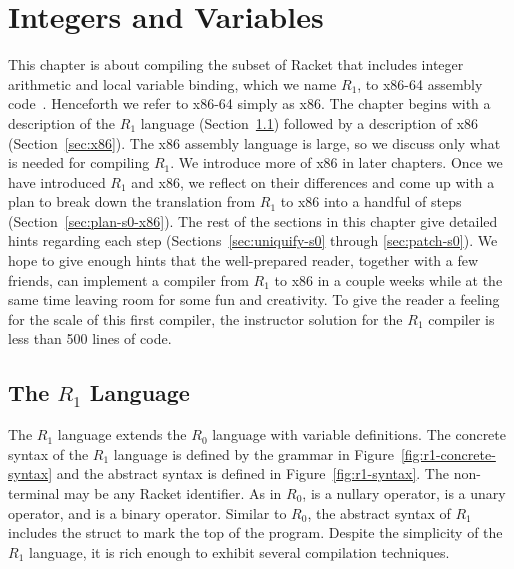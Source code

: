 \documentclass[11pt]{book}
\begin{document}
\chapter{Integers and Variables}
\label{ch:int-exp}

This chapter is about compiling the subset of Racket that includes
integer arithmetic and local variable binding, which we name $R_1$, to
x86-64 assembly code~\citep{Intel:2015aa}.  Henceforth we refer
to x86-64 simply as x86.  The chapter begins with a description of the
$R_1$ language (Section~\ref{sec:s0}) followed by a description of x86
(Section~\ref{sec:x86}). The x86 assembly language is large, so we
discuss only what is needed for compiling $R_1$. We introduce more of
x86 in later chapters. Once we have introduced $R_1$ and x86, we
reflect on their differences and come up with a plan to break down the
translation from $R_1$ to x86 into a handful of steps
(Section~\ref{sec:plan-s0-x86}).  The rest of the sections in this
chapter give detailed hints regarding each step
(Sections~\ref{sec:uniquify-s0} through \ref{sec:patch-s0}).  We hope
to give enough hints that the well-prepared reader, together with a
few friends, can implement a compiler from $R_1$ to x86 in a couple
weeks while at the same time leaving room for some fun and creativity.
To give the reader a feeling for the scale of this first compiler, the
instructor solution for the $R_1$ compiler is less than 500 lines of
code.

\section{The $R_1$ Language}
\label{sec:s0}

The $R_1$ language extends the $R_0$ language with variable
definitions.  The concrete syntax of the $R_1$ language is defined by
the grammar in Figure~\ref{fig:r1-concrete-syntax} and the abstract
syntax is defined in Figure~\ref{fig:r1-syntax}.  The non-terminal
\Var{} may be any Racket identifier. As in $R_0$,  is a
nullary operator, \key{-} is a unary operator, and \key{+} is a binary
operator.  Similar to $R_0$, the abstract syntax of $R_1$ includes the
 struct to mark the top of the program.
Despite the simplicity of the $R_1$ language, it is rich enough to
exhibit several compilation techniques.
\end{document}
